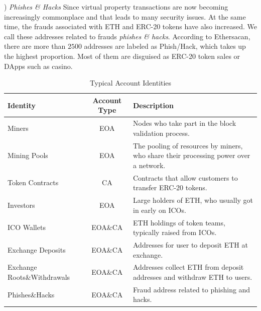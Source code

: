 ) \emph{Phishes \& Hacks}
Since virtual property transactions are now becoming increasingly commonplace and that leads to many security issues. At the same time, the frauds associated with ETH and ERC-20 tokens have also increased. We call these addresses related to frauds \emph{phishes \& hacks}. According to Ethersacan, there are more than $2500$ addresses are labeled as Phish/Hack, which takes up the highest proportion. Most of them are disguised as ERC-20 token sales or DApps such as casino. 

\begin{table}[t]
\caption{Typical Account Identities}
\begin{center}
\begin{tabular}{|p{2.1cm}|c|p{3.9cm}|}
\hline
\textbf{Identity} & \textbf{Account Type}& \textbf{Description} \\
\hline
Miners & EOA & Nodes who take part in the block validation process. \\ \hline
Mining Pools & EOA & The pooling of resources by miners, who share their processing power over a network.\\ \hline
Token Contracts & CA & Contracts that allow customers to transfer ERC-20 tokens. \\ \hline
Investors & EOA & Large holders of ETH, who usually got in early on ICOs. \\ \hline
ICO Wallets & EOA\&CA & ETH holdings of token teams, typically raised from ICOs. \\ \hline
Exchange Deposits & EOA\&CA & Addresses for user to deposit ETH at exchange. \\ \hline
Exchange Roots\&Withdrawals & EOA\&CA & Addresses collect ETH from deposit addresses and withdraw ETH to users. \\ \hline
Phishes\&Hacks & EOA\&CA & Fraud address related to phishing and hacks. \\ \hline
\end{tabular}
\label{table:identity}
\end{center}
\end{table}





